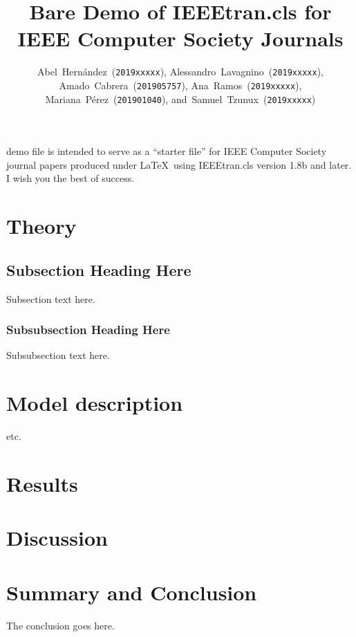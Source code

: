 \documentclass[10pt,journal,compsoc]{IEEEtran}
\title{Bare Demo of IEEEtran.cls for\\ IEEE Computer Society Journals}
\author{Abel~Hernández~(\texttt{2019xxxxx}),
        Alessandro~Lavagnino~(\texttt{2019xxxxx}),
        Amado~Cabrera~(\texttt{201905757}),
        Ana~Ramos~(\texttt{2019xxxxx}),
        Mariana~Pérez~(\texttt{201901040}),
        and~Samuel~Tzunux~(\texttt{2019xxxxx})}
\begin{document}
\maketitle

 demo file is intended to serve as a ``starter file'' for IEEE Computer Society journal papers produced under \LaTeX\ using IEEEtran.cls version 1.8b and later. I wish you the best of success.

\section{Theory}
\subsection{Subsection Heading Here}
Subsection text here.

\subsubsection{Subsubsection Heading Here}
Subsubsection text here.

\section{Model description}
etc.

\section{Results}

\section{Discussion}

\section{Summary and Conclusion}
The conclusion goes here.

%
%
%
\end{document}

